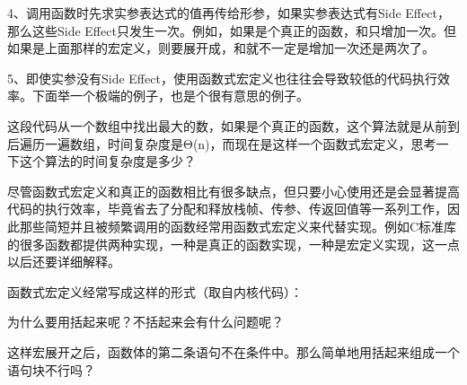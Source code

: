 4、调用函数时先求实参表达式的值再传给形参，如果实参表达式有Side Effect，那么这些Side Effect只发生一次。例如，如果是个真正的函数，和只增加一次。但如果是上面那样的宏定义，则要展开成，和就不一定是增加一次还是两次了。



5、即使实参没有Side Effect，使用函数式宏定义也往往会导致较低的代码执行效率。下面举一个极端的例子，也是个很有意思的例子。





这段代码从一个数组中找出最大的数，如果是个真正的函数，这个算法就是从前到后遍历一遍数组，时间复杂度是Θ(n)，而现在是这样一个函数式宏定义，思考一下这个算法的时间复杂度是多少？



尽管函数式宏定义和真正的函数相比有很多缺点，但只要小心使用还是会显著提高代码的执行效率，毕竟省去了分配和释放栈帧、传参、传返回值等一系列工作，因此那些简短并且被频繁调用的函数经常用函数式宏定义来代替实现。例如C标准库的很多函数都提供两种实现，一种是真正的函数实现，一种是宏定义实现，这一点以后还要详细解释。



函数式宏定义经常写成这样的形式（取自内核代码）：




为什么要用括起来呢？不括起来会有什么问题呢？




这样宏展开之后，函数体的第二条语句不在条件中。那么简单地用括起来组成一个语句块不行吗？




